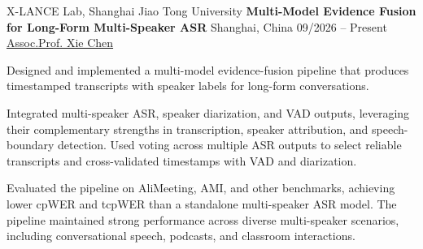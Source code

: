 
\VectraResearchExperienceEntry
    {X-LANCE Lab, Shanghai Jiao Tong University}
    {\textbf{Multi-Model Evidence Fusion for Long-Form Multi-Speaker ASR}}
    {Shanghai, China}
    {09/2026 -- Present}
    {\href{https://chenxie95.github.io/en}{Assoc.Prof. Xie Chen}}
    {}
    {
        \item Designed and implemented a multi-model evidence-fusion pipeline that produces timestamped transcripts with speaker labels for long-form conversations.
        \item Integrated multi-speaker ASR, speaker diarization, and VAD outputs, leveraging their complementary strengths in transcription, speaker attribution, and speech-boundary detection. Used voting across multiple ASR outputs to select reliable transcripts and cross-validated timestamps with VAD and diarization.
        \item Evaluated the pipeline on AliMeeting, AMI, and other benchmarks, achieving lower cpWER and tcpWER than a standalone multi-speaker ASR model. The pipeline maintained strong performance across diverse multi-speaker scenarios, including conversational speech, podcasts, and classroom interactions.
    }
